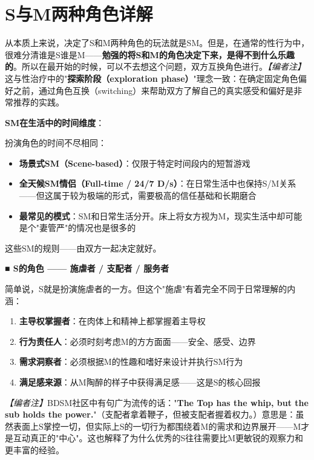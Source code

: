 \documentclass[12pt,UTF8]{ctexbook}
\begin{document}
\section{S与M两种角色详解}

从本质上来说，决定了S和M两种角色的玩法就是SM。但是，在通常的性行为中，很难分清谁是S谁是M——\textbf{勉强的将S和M的角色决定下来，是得不到什么乐趣的}。所以在最开始的时候，可以不去想这个问题，双方互换角色进行。\textit{【编者注】}这与性治疗中的"\textbf{探索阶段（exploration phase）}"理念一致：在确定固定角色偏好之前，通过角色互换（switching）来帮助双方了解自己的真实感受和偏好是非常推荐的实践。

\noindent\textbf{SM在生活中的时间维度}：

扮演角色的时间不尽相同：
\begin{itemize}
	\item \textbf{场景式SM（Scene-based）}：仅限于特定时间段内的短暂游戏
	\item \textbf{全天候SM情侣（Full-time / 24/7 D/s）}：在日常生活中也保持S/M关系——但这属于较为极端的形式，需要极高的信任基础和长期磨合
	\item \textbf{最常见的模式}：SM和日常生活分开。床上将女方视为M，现实生活中却可能是个"妻管严"的情况也是很多的
\end{itemize}

这些SM的规则——由双方一起决定就好。

\noindent\textbf{■ S的角色 —— 施虐者 / 支配者 / 服务者}

简单说，S就是扮演施虐者的一方。但这个"施虐"有着完全不同于日常理解的内涵：

\begin{enumerate}
	\item \textbf{主导权掌握者}：在肉体上和精神上都掌握着主导权
	\item \textbf{行为责任人}：必须时刻考虑M的方方面面——安全、感受、边界
	\item \textbf{需求洞察者}：必须根据M的性趣和嗜好来设计并执行SM行为
	\item \textbf{满足感来源}：从M陶醉的样子中获得满足感——这是S的核心回报
\end{enumerate}

\textit{【编者注】}BDSM社区中有句广为流传的话："\textbf{The Top has the whip, but the sub holds the power.}"（支配者拿着鞭子，但被支配者握着权力。）意思是：虽然表面上S掌控一切，但实际上S的一切行为都围绕着M的需求和边界展开——M才是互动真正的"中心"。这也解释了为什么优秀的S往往需要比M更敏锐的观察力和更丰富的经验。
\end{document}
